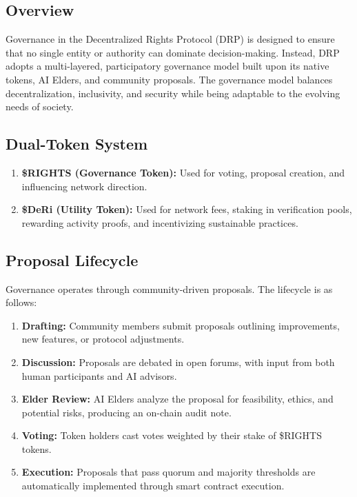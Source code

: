 \documentclass[11pt,a4paper]{article}
\begin{document}
\subsection{Overview}
Governance in the Decentralized Rights Protocol (DRP) is designed to ensure that no single entity or authority can dominate decision-making. 
Instead, DRP adopts a multi-layered, participatory governance model built upon its native tokens, AI Elders, and community proposals. 
The governance model balances decentralization, inclusivity, and security while being adaptable to the evolving needs of society.

\subsection{Dual-Token System}
\begin{enumerate}
    \item \textbf{\$RIGHTS (Governance Token):} Used for voting, proposal creation, and influencing network direction.
    \item \textbf{\$DeRi (Utility Token):} Used for network fees, staking in verification pools, rewarding activity proofs, and incentivizing sustainable practices.
\end{enumerate}

\subsection{Proposal Lifecycle}
Governance operates through community-driven proposals. The lifecycle is as follows:
\begin{enumerate}
    \item \textbf{Drafting:} Community members submit proposals outlining improvements, new features, or protocol adjustments.
    \item \textbf{Discussion:} Proposals are debated in open forums, with input from both human participants and AI advisors.
    \item \textbf{Elder Review:} AI Elders analyze the proposal for feasibility, ethics, and potential risks, producing an on-chain audit note.
    \item \textbf{Voting:} Token holders cast votes weighted by their stake of \$RIGHTS tokens.
    \item \textbf{Execution:} Proposals that pass quorum and majority thresholds are automatically implemented through smart contract execution.
\end{enumerate}
\end{document}
